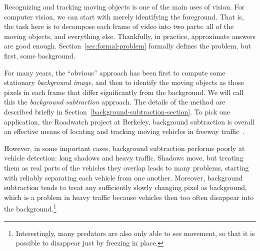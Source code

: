 \newcommand{\secref}[1]{Section~\ref{#1}}
\newcommand{\figref}[1]{Figure~\ref{#1}}
\newcommand{\tabref}[1]{Table~\ref{#1}}
\renewcommand{\eqref}[1]{Equation~(\ref{#1})}

\newcommand{\mbf}[1]{\mbox{{\bf #1}}}
\newcommand{\smbf}[1]{\mbox{{\scriptsize\bf #1}}}
\def\w{\mbf{w}}


Recognizing and tracking moving
objects is one of the main uses of vision.
For computer vision, we can start with merely identifying the
foreground.
That is, the task here is to decompose
each frame of video into two parts: all of the moving objects, and
everything else.  Thankfully, in practice, approximate answers are
good enough.  \secref{sec:formal-problem} formally defines the problem,
but first, some background.

For many years, the ``obvious'' approach has
been first to compute some stationary {\em background image}, and then to
identify the moving objects as those pixels in each frame that
differ significantly from the background. We will call this the
{\em background subtraction} approach.
The details of the method are described briefly in
\secref{background-subtraction-section}.
To pick one application, the Roadwatch project at Berkeley,
background subtraction is overall an effective means of
locating and tracking moving vehicles in freeway
traffic~\cite{Koller+al:1994}.


However, in some important cases, background subtraction performs
poorly at vehicle detection: long shadows and heavy traffic.
Shadows move, but treating them as real parts of the vehicles they
overlap leads to many problems, starting with reliably separating each
vehicle from one another.
Moreover, background subtraction tends to treat any
sufficiently slowly changing pixel as
background, which is a problem in heavy traffic because vehicles
then too often disappear into the background.\footnote{Interestingly,
  many predators are also only able to see movement, so that
  it is possible to disappear just by freezing in place.}

